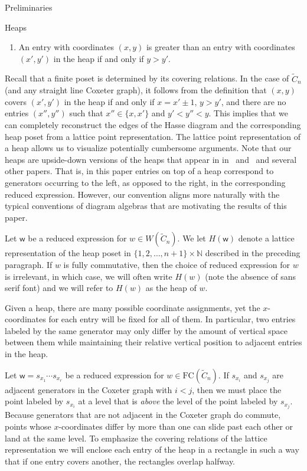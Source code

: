 \documentclass[12pt]{amsart}
\newcommand{\N}{\mathbb{N}}
\newcommand{\C}{\widetilde{C}}
\renewcommand{\(}{\left(}
\renewcommand{\)}{\right)}
\newcommand{\w}{\mathsf{w}}
\newcommand{\FC}{\mathrm{FC}}
\begin{document}
\begin{section}{Preliminaries}
\begin{subsection}{Heaps}
\begin{enumerate}
\item An entry with coordinates $(x,y)$ is greater than an entry with coordinates $(x',y')$ in the heap if and only if $y > y'$.
\end{enumerate}

Recall that a finite poset is determined by its covering relations.  In the case of $\C_{n}$ (and any straight line Coxeter graph), it follows from the definition that $(x,y)$ covers $(x',y')$ in the heap if and only if $x = x' \pm 1$, $y > y'$, and there are no entries $(x'', y'')$ such that $x'' \in \{x, x'\}$ and $y'< y'' < y$.  This implies that we can completely reconstruct the edges of the Hasse diagram and the corresponding heap poset from a lattice point representation. The lattice point representation of a heap allows us to visualize potentially cumbersome arguments.  Note that our heaps are upside-down versions of the heaps that appear in in~\cite{Billey.S;Jones.B:A} and~\cite{Billey.S;Warrington.G:A} and several other papers.  That is, in this paper entries on top of a heap correspond to generators occurring to the left, as opposed to the right, in the corresponding reduced expression.  However, our convention aligns more naturally with the typical conventions of diagram algebras that are motivating the results of this paper.

Let $\w$ be a reduced expression for $w \in W(\C_{n})$.  We let $H(\w)$ denote a lattice representation of the heap poset in $\{1,2,\ldots,n+1\} \times \N$ described in the preceding paragraph.  If $w$ is fully commutative, then the choice of reduced expression for $w$ is irrelevant, in which case, we will often write $H(w)$ (note the absence of \textsf{sans serif} font) and we will refer to $H(w)$ as the heap of $w$.

Given a heap, there are many possible coordinate assignments, yet the $x$-co\-or\-di\-nates for each entry will be fixed for all of them.  In particular, two entries labeled by the same generator may only differ by the amount of vertical space between them while maintaining their relative vertical position to adjacent entries in the heap.

Let $\w=s_{x_1}\cdots s_{x_r}$ be a reduced expression for $w \in \FC(\C_{n})$.  If $s_{x_i}$ and $s_{x_j}$ are adjacent generators in the Coxeter graph with $i<j$, then we must place the point labeled by $s_{x_i}$ at a level that is \textit{above} the level of the point labeled by $s_{x_j}$.  Because generators that are not adjacent in the Coxeter graph do commute, points whose $x$-coordinates differ by more than one can slide past each other or land at the same level.  To emphasize the covering relations of the lattice representation we will enclose each entry of the heap in a rectangle in such a way that if one entry covers another, the rectangles overlap halfway.


\end{subsection}
\end{section}
\end{document}
